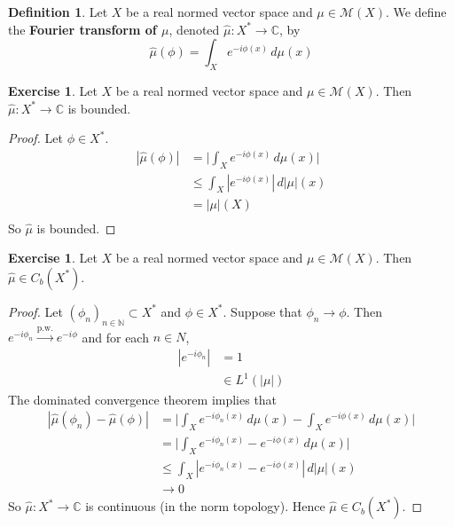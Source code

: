 \documentclass[12pt]{amsart}
\theoremstyle{definition}
\newtheorem{defn}[definition]{Definition}
\newtheorem{ex}[definition]{Exercise}
\newcommand{\C}{\mathbb{C}}
\newcommand{\N}{\mathbb{N}}
\newcommand{\MM}{\mathcal{M}}
\newcommand{\dmu}{\, d \mu}
\newcommand{\convt}[1]{\xrightarrow{\text{#1}}}
\begin{document}
	\begin{defn}
		Let $X$ be a real normed vector space and $\mu \in \MM(X)$. We define the \textbf{Fourier transform of $\mu$}, denoted $\hat{\mu}: X^* \rightarrow \C$, by
		$$\hat{\mu}(\phi) = \int_X e^{-i\phi(x)} \dmu(x)$$ 
	\end{defn}
	
	\begin{ex}
		Let $X$ be a real normed vector space and $\mu \in \MM(X)$. Then $\hat{\mu} : X^* \rightarrow \C$ is bounded.
	\end{ex}
	
	\begin{proof}
		Let $\phi \in X^*$. 
		\begin{align*}
			|\hat{\mu}(\phi)|
			& = \bigg | \int_X e^{-i \phi(x)} \dmu(x) \bigg| \\
			& \leq \int_X |e^{-i \phi(x)}| \, d|\mu|(x) \\
			& = |\mu|(X) \\
		\end{align*}
		So $\hat{\mu}$ is bounded.
	\end{proof}
	
	\begin{ex}
		Let $X$ be a real normed vector space and $\mu \in \MM(X)$. Then $\hat{\mu} \in C_b(X^*)$.
	\end{ex}
	
	\begin{proof}
		Let $(\phi_{n})_{n \in \N} \subset X^*$ and $\phi \in X^*$. Suppose that $\phi_n \rightarrow \phi$. Then $e^{-i \phi_n} \convt{p.w.} e^{-i\phi}$ and for each $n \in N$, 
		\begin{align*}
			|e^{-i \phi_n}| 
			& = 1 \\
			& \in L^1(|\mu|)
		\end{align*}
		The dominated convergence theorem implies that
		\begin{align*}
			|\hat{\mu}(\phi_n) - \hat{\mu}(\phi)| 
			& = \bigg| \int_X e^{-i \phi_n(x)} \dmu(x) - \int_X e^{-i \phi(x)} \dmu(x)\bigg| \\
			& =  \bigg| \int_X e^{-i \phi_n(x)} - e^{-i \phi(x)} \dmu(x) \bigg| \\
			& \leq \int_X |e^{-i \phi_n(x)} - e^{-i \phi(x)}| \, d|\mu|(x) \\
			& \rightarrow 0
		\end{align*}
		So $\hat{\mu}: X^* \rightarrow \C$ is continuous (in the norm topology). Hence $\hat{\mu} \in C_b(X^*)$.
	\end{proof}
	
\end{document}
